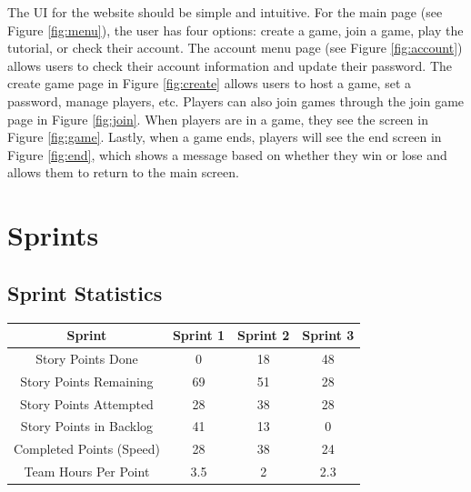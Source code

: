 \documentclass{article}
\begin{document}
The UI for the website should be simple and intuitive. For the main page (see Figure \ref{fig:menu}), the user has four options: create a game, join a game, play the tutorial, or check their account. The account menu page (see Figure \ref{fig:account}) allows users to check their account information and update their password. The create game page in Figure \ref{fig:create} allows users to host a game, set a password, manage players, etc. Players can also join games through the join game page in Figure \ref{fig:join}. When players are in a game, they see the screen in Figure \ref{fig:game}. Lastly, when a game ends, players will see the end screen in Figure \ref{fig:end}, which shows a message based on whether they win or lose and allows them to return to the main screen.

\section{Sprints}

\begin{tcolorbox}[colback=blue!10, colframe=blue, boxrule=0.5mm, sharp corners=south]
\subsection{Sprint Statistics}
\end{tcolorbox}
\begin{table}[h]
\centering
\begin{tabular}{|c|c|c|c|}
\hline
\textbf{Sprint}          & \textbf{Sprint 1} & \textbf{Sprint 2} & \textbf{Sprint 3} \\ \hline
Story Points Done        & 0                 & 18                & 48                \\ \hline
Story Points Remaining   & 69                & 51                & 28                \\ \hline
Story Points Attempted   & 28                & 38                & 28                \\ \hline
Story Points in Backlog  & 41                & 13                & 0                 \\ \hline
Completed Points (Speed) & 28                & 38                & 24                \\ \hline
Team Hours Per Point     & 3.5               & 2                 & 2.3               \\ \hline
\end{tabular}
\end{table}
\end{document}
